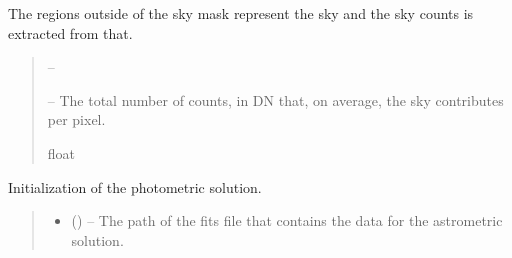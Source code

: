 \documentclass[letterpaper,11pt,english]{sphinxmanual}
\begin{document}
\begin{savenotes}
\begin{fulllineitems}
\begin{savenotes}
\begin{fulllineitems}
\sphinxAtStartPar
The regions outside of the sky mask represent the sky and the sky
counts is extracted from that.
\begin{quote}\begin{description}
\sphinxAtStartPar
{} – 

\sphinxAtStartPar
{} – The total number of counts, in DN that, on average, the sky
contributes per pixel.

\sphinxAtStartPar
float

\end{description}\end{quote}

\end{fulllineitems}\end{savenotes}


\begin{savenotes}\begin{fulllineitems}
\label{\detokenize{code/opihiexarata.photometry.solution:opihiexarata.photometry.solution.PhotometricSolution.__init__}}
\pysigstartsignatures
{}
\pysigstopsignatures
\sphinxAtStartPar
Initialization of the photometric solution.
\begin{quote}\begin{description}
\begin{itemize}
\item {} 
\sphinxAtStartPar
{} () – The path of the fits file that contains the data for the astrometric
solution.


\end{itemize}
\end{description}
\end{quote}
\end{fulllineitems}
\end{savenotes}
\end{fulllineitems}
\end{savenotes}
\end{document}
